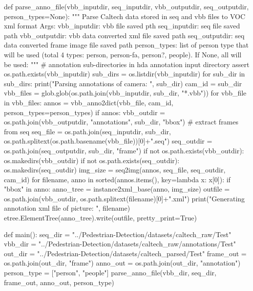 \begin{pythoncode}
def parse_anno_file(vbb_inputdir, seq_inputdir, vbb_outputdir, seq_outputdir, person_types=None):
    """
    Parse Caltech data stored in seq and vbb files to VOC xml format
    Args:
        vbb_inputdir: vbb file saved pth
        seq_inputdir: seq file saved path
        vbb_outputdir: vbb data converted xml file saved path
        seq_outputdir: seq data converted frame image file saved path
        person_types: list of person type that will be used (total 4 types: person, person-fa, person?, people).
            If None, all will be used:
    """
    # annotation sub-directories in hda annotation input directory
    assert os.path.exists(vbb_inputdir)
    sub_dirs = os.listdir(vbb_inputdir)
    for sub_dir in sub_dirs:
        print("Parsing annotations of camera: ", sub_dir)
        cam_id = sub_dir
        vbb_files = glob.glob(os.path.join(vbb_inputdir, sub_dir, "*.vbb"))
        for vbb_file in vbb_files:
            annos = vbb_anno2dict(vbb_file, cam_id, person_types=person_types)
            if annos:
                vbb_outdir = os.path.join(vbb_outputdir, "annotations", sub_dir, "bbox")
                # extract frames from seq
                seq_file = os.path.join(seq_inputdir, sub_dir, os.path.splitext(os.path.basename(vbb_file))[0]+".seq")
                seq_outdir = os.path.join(seq_outputdir, sub_dir, "frame")
                if not os.path.exists(vbb_outdir):
                    os.makedirs(vbb_outdir)
                if not os.path.exists(seq_outdir):
                    os.makedirs(seq_outdir)
                img_size = seq2img(annos, seq_file, seq_outdir, cam_id)
                for filename, anno in sorted(annos.items(), key=lambda x: x[0]):
                    if "bbox" in anno:
                        anno_tree = instance2xml_base(anno, img_size)
                        outfile = os.path.join(vbb_outdir, os.path.splitext(filename)[0]+".xml")
                        print("Generating annotation xml file of picture: ", filename)
                        etree.ElementTree(anno_tree).write(outfile, pretty_print=True)

def main():    
    seq_dir = "../Pedestrian-Detection/datasets/caltech_raw/Test"
    vbb_dir = "../Pedestrian-Detection/datasets/caltech_raw/annotations/Test"
    out_dir = "../Pedestrian-Detection/datasets/caltech_parsed/Test"
    frame_out = os.path.join(out_dir, "frame")
    anno_out = os.path.join(out_dir, "annotation")
    person_type = ["person", "people"]
    parse_anno_file(vbb_dir, seq_dir, frame_out, anno_out, person_type)
\end{pythoncode}
